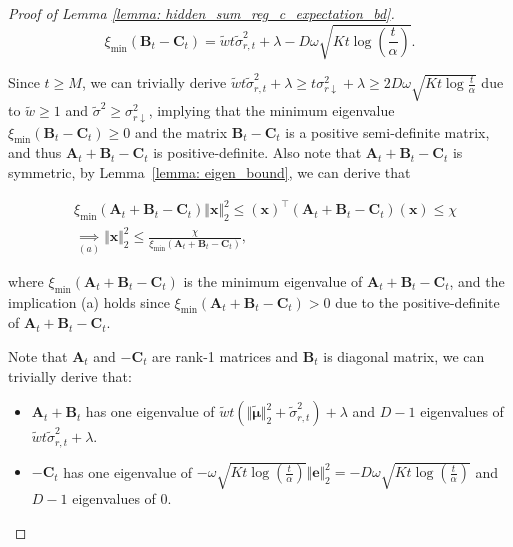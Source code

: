 \begin{proof}[Proof of Lemma \ref{lemma: hidden_sum_reg_c_expectation_bd}]
\[
\xi_{\min} (\boldsymbol{B}_t - \boldsymbol{C}_t) = \tilde{w} t \tilde{\sigma}^2_{r,t} + \lambda -D \omega \sqrt{ K t \log \left( \frac{t}{\alpha} \right)}.
\]

Since $t \geq M$, we can trivially derive $\tilde{w} t\tilde{\sigma}^2_{r,t} + \lambda \geq t \sigma^2_{r \downarrow} + \lambda \geq 2D \omega \sqrt{Kt\log \frac{t}{\alpha}}$ due to $\tilde{w}\geq 1$ and $\tilde{\sigma}^2 \geq \sigma^2_{r \downarrow}$, implying that the minimum eigenvalue $\xi_{\min} (\boldsymbol{B}_t - \boldsymbol{C}_t) \geq 0$ and
the matrix $\boldsymbol{B}_t - \boldsymbol{C}_t $ is a positive semi-definite matrix, and thus $\boldsymbol{A}_t + \boldsymbol{B}_t - \boldsymbol{C}_t$ is positive-definite. Also note that $\boldsymbol{A}_t + \boldsymbol{B}_t - \boldsymbol{C}_t$ is symmetric, by Lemma~\ref{lemma: eigen_bound}, we can derive that 

\begin{equation}
\begin{aligned}
\label{eq: ball_width_bd}
& \xi_{\min} \left( \boldsymbol{A}_t + \boldsymbol{B}_t - \boldsymbol{C}_t \right) \Vert \boldsymbol{x} \Vert_2^2
\leq
\left( \boldsymbol{x} \right)^{\top} \left( \boldsymbol{A}_t + \boldsymbol{B}_t - \boldsymbol{C}_t \right) \left( \boldsymbol{x} \right)
\leq
\chi \\
& \underset{(a)}{\implies}
\Vert \boldsymbol{x} \Vert_2^2 
\leq
\frac{\chi}{\xi_{\min} \left( \boldsymbol{A}_t + \boldsymbol{B}_t - \boldsymbol{C}_t \right)},
\end{aligned}
\end{equation}

where $\xi_{\min}\left( \boldsymbol{A}_t + \boldsymbol{B}_t - \boldsymbol{C}_t \right)$ is the minimum eigenvalue of $\boldsymbol{A}_t + \boldsymbol{B}_t - \boldsymbol{C}_t$, and the implication (a) holds since $\xi_{\min}\left( \boldsymbol{A}_t + \boldsymbol{B}_t - \boldsymbol{C}_t \right) > 0$ due to the positive-definite of $\boldsymbol{A}_t + \boldsymbol{B}_t - \boldsymbol{C}_t$.

Note that $\boldsymbol{A}_t$ and $-\boldsymbol{C}_t$ are rank-1 matrices and $\boldsymbol{B}_t$ is diagonal matrix, we can trivially derive that:

\begin{itemize}
\item 
$\boldsymbol{A}_t + \boldsymbol{B}_t$ has one eigenvalue of $\tilde{w} t(\Vert \boldsymbol{\tilde{\mu}} \Vert_2^2 + \tilde{\sigma}^2_{r,t}) + \lambda$ and $D-1$ eigenvalues of $ \tilde{w} t \tilde{\sigma}^2_{r,t} + \lambda$. 
\item $-\boldsymbol{C}_t$ has one eigenvalue of $- \omega \sqrt{ Kt\log \left( \frac{t}{\alpha} \right)} \Vert \boldsymbol{e} \Vert_2^2 = -D \omega \sqrt{ K t \log \left( \frac{t}{\alpha} \right)}$ and $D-1$ eigenvalues of 0.
\end{itemize}


\end{proof}
